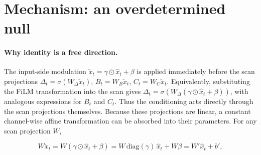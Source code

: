 \documentclass{article}
\begin{document}
\section{Mechanism: an overdetermined null}\label{sec:mechanism}

\paragraph{Why identity is a free direction.} The input-side modulation
$\tilde{x}_t = \gamma \odot \hat{x}_t + \beta$ is applied immediately before the
scan projections $\Delta_t = \sigma(W_\Delta \tilde{x}_t)$,
$B_t = W_B \tilde{x}_t$, $C_t = W_C \tilde{x}_t$. Equivalently, substituting the FiLM transformation into the scan gives
$\Delta_t=\sigma\!\left(W_\Delta(\gamma\odot\hat{x}_t+\beta)\right)$,
with analogous expressions for \(B_t\) and \(C_t\). Thus the
conditioning acts directly through the scan projections themselves.
Because these projections are linear, a constant channel-wise affine transformation can be absorbed into their parameters. For any scan projection \(W\),

\begin{equation}
W\tilde{x}_t
=
W(\gamma \odot \hat{x}_t + \beta)
=
W\,\mathrm{diag}(\gamma)\,\hat{x}_t + W\beta
=
W'\hat{x}_t + b',
\end{equation}
\end{document}
